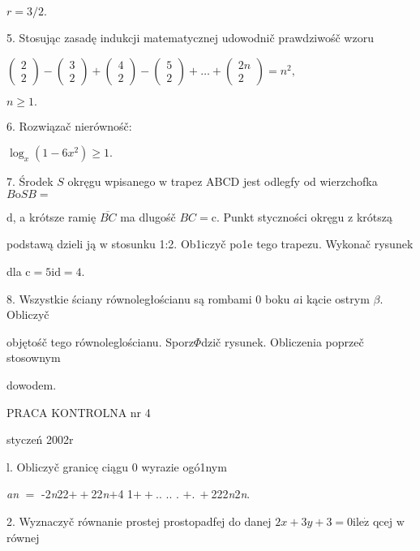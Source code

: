 \documentclass[a4paper,12pt]{article}
\begin{document}
$r=3/2.$

5. Stosując zasadę indukcji matematycznej udowodnič prawdziwośč wzoru

$\left(\begin{array}{l}
2\\
2
\end{array}\right) - \left(\begin{array}{l}
3\\
2
\end{array}\right) + \left(\begin{array}{l}
4\\
2
\end{array}\right) - \left(\begin{array}{l}
5\\
2
\end{array}\right) +\ldots+\left(\begin{array}{l}
2n\\
2
\end{array}\right) =n^{2},$

$n\geq 1.$

6. Rozwiązač nierównośč:

$\log_{x}(1-6x^{2})\geq 1.$

7. Środek $S$ okręgu wpisanego $\mathrm{w}$ trapez ABCD jest odlegfy od wierzchofka $B\mathrm{o}SB=$

$\mathrm{d}$, a krótsze ramię $\overline{BC}$ ma dlugośč $BC = \mathrm{c}$. Punkt styczności okręgu $\mathrm{z}$ krótszą

podstawą dzieli ją $\mathrm{w}$ stosunku 1:2. Ob1iczyč po1e tego trapezu. Wykonač rysunek

dla $\mathrm{c}=5\mathrm{i}\mathrm{d}=4.$

8. Wszystkie ściany równoległościanu są rombami $0$ boku $a\mathrm{i}$ kącie ostrym $\beta$. Obliczyč

objętośč tego równoleglościanu. Sporz$\Phi$dzič rysunek. Obliczenia poprzeč stosownym

dowodem.





PRACA KONTROLNA nr 4

styczeń 2002r

l. Obliczyč granicę ciągu 0 wyrazie ogó1nym

{\it an} $=$ -2{\it n}22$++$22{\it n}$+$4 1$++$.. .. . $+.\ +$222{\it n}2{\it n}.

2. Wyznaczyč równanie prostej prostopadfej do danej $2x+3y+3=0\mathrm{i}\mathrm{l}\mathrm{e}\dot{\mathrm{z}}$ qcej $\mathrm{w}$ równej
\end{document}
